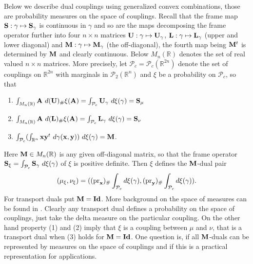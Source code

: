 \documentclass{amsart}
\numberwithin{equation}{section}
\newcommand\cP{{\mathcal P}}
\newcommand\bA{{\bf A}}
\newcommand\bL{{\bf L}}
\newcommand\bM{{\bf M}}
\newcommand\bU{{\bf U}}
\newcommand\bS{{\bf S}}
\newcommand\R{{\mathbb R}}
\newcommand\id{{\operatorname{\bf Id}}}
\newcommand\pr{{\operatorname{pr}}}
\theoremstyle{plain}
\theoremstyle{definition}
\begin{document}
\noindent Below we describe dual couplings using generalized convex combinations, those are probability measures on the space of couplings. 
Recall that the frame map $\bS: \gamma \mapsto \bS_{\gamma}$ is continuous in $\gamma$ and so are the maps decomposing
the frame operator further into four $n\times n$ matrices $\bU: \gamma \mapsto \bU_{\gamma}$, $\bL: \gamma \mapsto \bL_{\gamma}$ (upper and lower diagonal) and $\bM: \gamma \mapsto \bM_{\gamma}$ (the off-diagonal), the fourth map being $\bM^t$ is determined by $\bM$ and clearly continuous.   
Below $M_n(\R)$ denotes the set of real valued $n\times n$ matrices. 
More precisely, let $\cP_c=\cP_c(\R^{2n})$ denote the set of couplings on $\R^{2n}$ with marginals in $\cP_2(\R^n)$ and  
$\xi$ be a probability on $\cP_c$, so that
\begin{enumerate}
    \item $\int_{M_n(\R)}\bA\ d (\bU)_{\#}\xi(\bA)=\int_{\cP_c}\bU_{\gamma}\ d \xi(\gamma) = \bS_{\mu}$
    \item $\int_{M_n(\R)}\bA\ d (\bL)_{\#}\xi(\bA)=\int_{\cP_c}\bL_{\gamma}\ d \xi(\gamma) = \bS_{\nu}$ 
    \item $\int_{\cP_c}(\int_{\R^n} {\bf x} {\bf y}^t  \ d \gamma({\bf x}, {\bf y}) )\  d \xi(\gamma)=\bM$.
\end{enumerate}
Here $\bM \in M_n(\R)$ is any given off-diagonal matrix, so that the frame operator $\bS_{\xi}=\int_{\cP_c}\bS_{\gamma}\ d \xi(\gamma)$ 
of $\xi$ is positive definite. Then $\xi$ defines the $\bM$-dual pair 
\[ (\mu_{\xi}, \nu_{\xi})=((\pr_{{\bf x}})_{\#} \int_{\cP_c} d  \xi(\gamma),(\pr_{{\bf y}})_{\#} \int_{\cP_c} d  \xi(\gamma) ).
\]
For transport duals put $\bM=\id$.   
More background on the space of measures can be found in \cite{einsiedler}. 
Clearly any transport dual defines a probability on the space of couplings, just take the delta measure on the particular coupling. 
On the other hand property (1) and (2) imply that $\xi$ is a coupling between $\mu$ and $\nu$, that is a transport dual when (3) holds  
for $\bM=\id$. One question is, if all ${\bf M}$-duals can be represented by measures on the space of couplings and if this is a practical 
representation for applications. 
\end{document}
